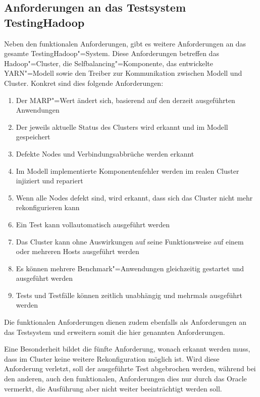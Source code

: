 \subsection{Anforderungen an das Testsystem TestingHadoop}
\label{subsec:testRequirements}

Neben den funktionalen Anforderungen, gibt es weitere Anforderungen an das gesamte TestingHadoop"=System.
Diese Anforderungen betreffen das Hadoop"=Cluster, die Selfbalancing"=Komponente, das entwickelte YARN"=Modell sowie den Treiber zur Kommunikation zwischen Modell und Cluster.
Konkret sind dies folgende Anforderungen:

\begin{enumerate}
    \item Der \gls{MARP}"=Wert ändert sich, basierend auf den derzeit ausgeführten Anwendungen
    \item Der jeweils aktuelle Status des Clusters wird erkannt und im Modell gespeichert
    \item Defekte Nodes und Verbindungsabbrüche werden erkannt
    \item Im Modell implementierte Komponentenfehler werden im realen Cluster injiziert und repariert
    \item Wenn alle Nodes defekt sind, wird erkannt, dass sich das Cluster nicht mehr rekonfigurieren kann
    \item Ein Test kann vollautomatisch ausgeführt werden
    \item Das Cluster kann ohne Auswirkungen auf seine Funktionsweise auf einem oder mehreren Hosts ausgeführt werden
    \item Es können mehrere Benchmark"=Anwendungen gleichzeitig gestartet und ausgeführt werden
    \item Tests und Testfälle können zeitlich unabhängig und mehrmals ausgeführt werden
\end{enumerate}

Die funktionalen Anforderungen dienen zudem ebenfalls als Anforderungen an das Testsystem und erweitern somit die hier genannten Anforderungen.

Eine Besonderheit bildet die fünfte Anforderung, wonach erkannt werden muss, dass im Cluster keine weitere Rekonfiguration möglich ist.
Wird diese Anforderung verletzt, soll der ausgeführte Test abgebrochen werden, während bei den anderen, auch den funktionalen, Anforderungen dies nur durch das Oracle vermerkt, die Ausführung aber nicht weiter beeinträchtigt werden soll.
